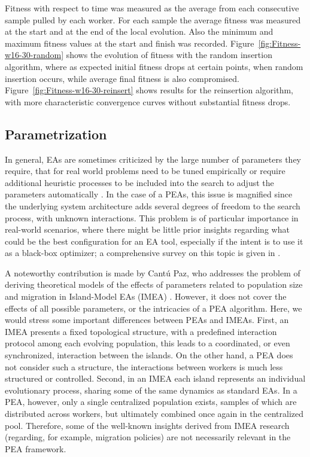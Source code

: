 Fitness with respect to time was measured as the average from each consecutive
sample pulled by each worker. For each sample the average fitness
was measured at the start and at the end of the local evolution.
Also the minimum and maximum fitness values at the start and finish was 
recorded.    
Figure~\ref{fig:Fitness-w16-30-random} shows the evolution of fitness
with the random insertion algorithm, where as expected initial fitness drops
at certain points, when random insertion occurs, while average final fitness 
is also compromised. Figure~\ref{fig:Fitness-w16-30-reinsert}
shows results for the reinsertion algorithm, with more
characteristic convergence curves without substantial fitness drops. 





\subsection{Parametrization}
In general, EAs are sometimes criticized by the large number of parameters they require,
that for real world problems need to be tuned empirically or require additional heuristic processes to be included into the search to
adjust the parameters automatically \cite{parameters,ss}.
In the case of a PEAs, this issue is magnified since the underlying system architecture adds several degrees of freedom to the search process,
with unknown interactions.
This problem is of particular importance in real-world scenarios, where there might be little prior insights regarding what could be the best
configuration for an EA tool, especially if the intent is to use it as a black-box optimizer;
a comprehensive survey on this topic is given in \cite{parameters}. 

A noteworthy contribution is made by Cant\'u Paz, who addresses the problem of deriving theoretical models of the effects
of parameters related to population size and migration in Island-Model EAs (IMEA) \cite{cantu}.
However, it does not cover the effects of all possible parameters, or the intricacies of a PEA algorithm.
Here, we would stress some important differences between PEAs and IMEAs.
First, an IMEA presents a fixed topological structure, with a predefined interaction protocol among each evolving population,
this leads to a coordinated, or even synchronized, interaction between the islands.
On the other hand, a PEA does not consider such a structure, the interactions between workers is much less structured or controlled.
Second, in an IMEA each island represents an individual evolutionary process, sharing some of the same dynamics as standard EAs.
In a PEA, however, only a single centralized population exists, samples of which are distributed across workers, but ultimately combined once again
in the centralized pool.
Therefore, some of the well-known insights derived from IMEA research (regarding, for example, migration policies) are not necessarily relevant in the PEA framework.

